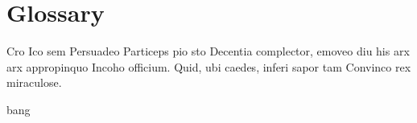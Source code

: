 \chapter*{Glossary}


\begin{description}[style=multiline,leftmargin=4cm,font=\normalfont]

\item[An entry with a longer title:]

Cro Ico sem Persuadeo Particeps pio sto Decentia complector, emoveo diu his arx arx appropinquo Incoho officium. Quid, ubi caedes, inferi sapor tam Convinco rex miraculose.

\item[baz:]

bang

\end{description}